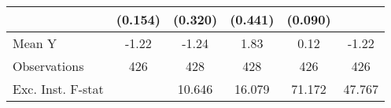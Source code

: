 {\begin{tabular}{l*{5}{c}}
            &     (0.154)         &     (0.320)         &     (0.441)         &     (0.090)         &                     \\
\midrule
Mean Y      &       -1.22         &       -1.24         &        1.83         &        0.12         &       -1.22         \\
Observations&         426         &         428         &         428         &         426         &         426         \\
Exc. Inst. F-stat&                     &      10.646         &      16.079         &      71.172         &      47.767         \\
\bottomrule
\end{tabular}
}
